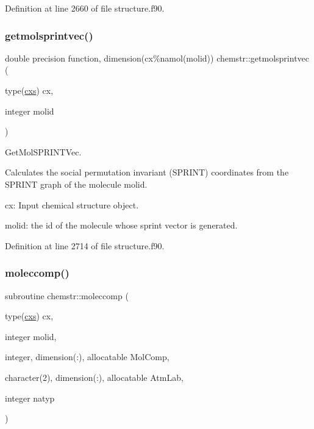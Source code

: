 Definition at line 2660 of file structure.\+f90.

\mbox{\label{namespacechemstr_afabbf69cf7b56ec0c275afa8de941dd8}} 
\subsubsection{\texorpdfstring{getmolsprintvec()}{getmolsprintvec()}}
{\footnotesize\ttfamily double precision function, dimension(cx\%namol(molid)) chemstr\+::getmolsprintvec (\begin{DoxyParamCaption}\item[{type(\mbox{\hyperlink{structchemstr_1_1cxs}{cxs}})}]{cx,  }\item[{integer}]{molid }\end{DoxyParamCaption})}



Get\+Mol\+S\+P\+R\+I\+N\+T\+Vec. 

Calculates the social permutation invariant (S\+P\+R\+I\+NT) coordinates from the S\+P\+R\+I\+NT graph of the molecule molid.


\begin{DoxyItemize}
\item cx\+: Input chemical structure object.
\item molid\+: the id of the molecule whose sprint vector is generated. 
\end{DoxyItemize}

Definition at line 2714 of file structure.\+f90.

\mbox{\label{namespacechemstr_a4a2608dcb652cb00a11013cccf4e94b8}} 
\subsubsection{\texorpdfstring{moleccomp()}{moleccomp()}}
{\footnotesize\ttfamily subroutine chemstr\+::moleccomp (\begin{DoxyParamCaption}\item[{type(\mbox{\hyperlink{structchemstr_1_1cxs}{cxs}})}]{cx,  }\item[{integer}]{molid,  }\item[{integer, dimension(\+:), allocatable}]{Mol\+Comp,  }\item[{character(2), dimension(\+:), allocatable}]{Atm\+Lab,  }\item[{integer}]{natyp }\end{DoxyParamCaption})}



